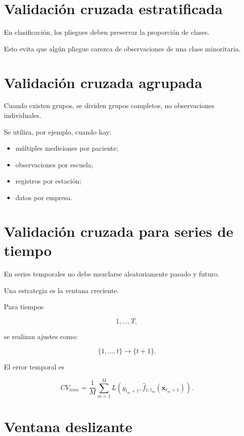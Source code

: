 \documentclass[
  spanish,
  11pt,
  letterpaper,
  DIV=11,
  numbers=noendperiod]{scrreprt}
\providecommand{\tightlist}{%
  \setlength{\itemsep}{0pt}\setlength{\parskip}{0pt}}
\theoremstyle{definition}
\theoremstyle{plain}
\theoremstyle{definition}
\theoremstyle{remark}
\begin{document}
\section{Validación cruzada
estratificada}\label{validaciuxf3n-cruzada-estratificada}

En clasificación, los pliegues deben preservar la proporción de clases.

Esto evita que algún pliegue carezca de observaciones de una clase
minoritaria.

\section{Validación cruzada
agrupada}\label{validaciuxf3n-cruzada-agrupada}

Cuando existen grupos, se dividen grupos completos, no observaciones
individuales.

Se utiliza, por ejemplo, cuando hay:

\begin{itemize}
\tightlist
\item
  múltiples mediciones por paciente;
\item
  observaciones por escuela;
\item
  registros por estación;
\item
  datos por empresa.
\end{itemize}

\section{Validación cruzada para series de
tiempo}\label{validaciuxf3n-cruzada-para-series-de-tiempo}

En series temporales no debe mezclarse aleatoriamente pasado y futuro.

Una estrategia es la ventana creciente.

Para tiempos

\[
1,\ldots,T,
\]

se realizan ajustes como:

\[
\{1,\ldots,t\}
\to
\{t+1\}.
\]

El error temporal es

\[
CV_{time}
=
\frac{1}{M}
\sum_{m=1}^{M}
L
\left(
y_{t_m+1},
\widehat{f}_{1:t_m}(\mathbf{x}_{t_m+1})
\right).
\]

\section{Ventana deslizante}\label{ventana-deslizante}
\end{document}
